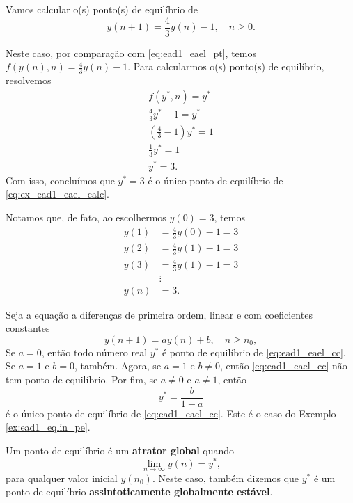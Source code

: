 \begin{ex}\label{ex:ead1_eqlin_pe}
  Vamos calcular o(s) ponto(s) de equilíbrio de
  \begin{equation}\label{eq:ex_ead1_eael_calc}
    y(n+1) = \frac{4}{3}y(n)-1,\quad n\geq 0.
  \end{equation}

  Neste caso, por comparação com \eqref{eq:ead1_eael_pt}, temos $\displaystyle f(y(n),n) = \frac{4}{3}y(n)-1$. Para calcularmos o(s) ponto(s) de equilíbrio, resolvemos
  \begin{gather}
    f(y^*,n) = y^* \\
    \frac{4}{3}y^*-1 = y^* \\
    \left(\frac{4}{3}-1\right)y^* = 1 \\
    \frac{1}{3}y^* = 1 \\
    y^* = 3.
  \end{gather}
  Com isso, concluímos que $y^*=3$ é o único ponto de equilíbrio de \eqref{eq:ex_ead1_eael_calc}.

  Notamos que, de fato, ao escolhermos $y(0)=3$, temos
  \begin{align}
    y(1) &= \frac{4}{3}y(0) - 1 = 3 \\
    y(2) &= \frac{4}{3}y(1) - 1 = 3 \\
    y(3) &= \frac{4}{3}y(1) - 1 = 3 \\
         &\vdots \\
    y(n) &= 3.
  \end{align}
\end{ex}

Seja a equação a diferenças de primeira ordem, linear e com coeficientes constantes
\begin{equation}\label{eq:ead1_eael_cc}
  y(n+1) = ay(n) + b,\quad n\geq n_0,
\end{equation}
Se $a=0$, então todo número real $y^*$ é ponto de equilíbrio de \eqref{eq:ead1_eael_cc}. Se $a=1$ e $b=0$, também. Agora, se $a=1$ e $b\neq 0$, então \eqref{eq:ead1_eael_cc} não tem ponto de equilíbrio. Por fim, se $a\neq 0$ e $a\neq 1$, então
\begin{equation}
  y^* = \frac{b}{1-a}
\end{equation}
é o único ponto de equilíbrio de \eqref{eq:ead1_eael_cc}. Este é o caso do Exemplo \ref{ex:ead1_eqlin_pe}.

Um ponto de equilíbrio é um {\bf atrator global} quando
\begin{equation}
  \lim_{n\to\infty} y(n) = y^*,
\end{equation}
para qualquer valor inicial $y(n_0)$. Neste caso, também dizemos que $y^*$ é um ponto de equilíbrio {\bf assintoticamente globalmente estável}.

